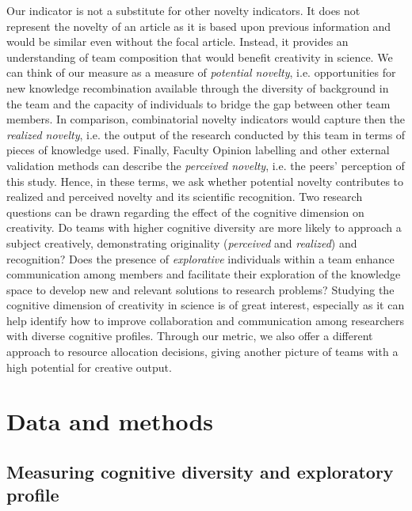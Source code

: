       
        Our indicator is not a substitute for other novelty indicators. It does not represent the novelty of an article as it is based upon previous information and would be similar even without the focal article. Instead, it provides an understanding of team composition that would benefit creativity in science.
        We can think of our measure as a measure of \textit{potential novelty}, i.e. opportunities for new knowledge recombination available through the diversity of background in the team and the capacity of individuals to bridge the gap between other team members. In comparison, combinatorial novelty indicators would capture then the \textit{realized novelty}, i.e. the output of the research conducted by this team in terms of pieces of knowledge used. Finally, Faculty Opinion labelling and other external validation methods can describe the \textit{perceived novelty}, i.e. the peers' perception of this study. Hence, in these terms, we ask whether potential novelty contributes to realized and perceived novelty and its scientific recognition. Two research questions can be drawn regarding the effect of the cognitive dimension on creativity. Do teams with higher cognitive diversity are more likely to approach a subject creatively, demonstrating originality (\textit{perceived} and \textit{realized}) and recognition? Does the presence of \textit{explorative} individuals within a team enhance communication among members and facilitate their exploration of the knowledge space to develop new and relevant solutions to research problems? Studying the cognitive dimension of creativity in science is of great interest, especially as it can help identify how to improve collaboration and communication among researchers with diverse cognitive profiles. Through our metric, we also offer a different approach to resource allocation decisions, giving another picture of teams with a high potential for creative output. \\








\section{Data and methods}\label{3}


\subsection{Measuring cognitive diversity and exploratory profile}\label{3.1}
        
